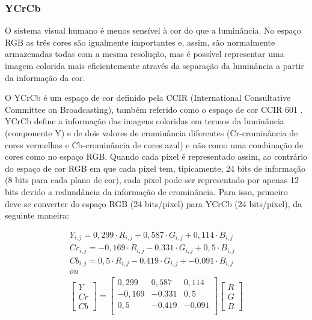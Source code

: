 \subsubsection{YCrCb}
O sistema visual humano é menos sensível à cor do que a luminância. No espaço RGB as três cores são igualmente importantes e, assim, são normalmente armazenadas todas com a mesma resolução, mas é possível representar uma imagem colorida mais eficientemente através da separação da luminância a partir da informação da cor. \cite{richardson2011h}

O YCrCb é um espaço de cor definido pela CCIR (International Consultative Committee on Broadcasting), também referido como o espaço de cor CCIR 601 \cite{acharya2002integrated}. YCrCb define a informação  das imagens coloridas  em termos da luminância (componente Y) e de dois valores de crominância diferentes (Cr-crominância de cores vermelhas e Cb-crominância de cores azul) e não como uma combinação de cores como no espaço RGB. Quando cada pixel é representado assim, ao contrário do espaço de cor RGB em que cada pixel tem, tipicamente, 24 bits de informação (8 bits para cada plano de cor), cada pixel pode ser representado por apenas 12 bits devido a redundância da informação de crominância. Para isso, primeiro deve-se converter do espaço RGB (24 bits/pixel) para YCrCb (24 bits/pixel), da seguinte maneira:
\begin{center}
	\begin{equation}
	\begin{split}
	Y_{i,j} = 0,299\cdot R_{i,j} + 0,587\cdot G_{i,j} + 0,114\cdot B_{i,j}\\
	Cr_{i,j} = -0,169\cdot R_{i,j} -0.331\cdot G_{i,j} + 0,5\cdot B_{i,j}\\
	Cb_{i,j} = 0,5\cdot R_{i,j} -0.419\cdot G_{i,j} + -0.091\cdot B_{i,j}\\
	ou \\
	\begin{bmatrix}		
	Y\\ Cr \\ Cb
	\end{bmatrix}
	 = 
	\begin{bmatrix}
  		0,299 & 0,587 &  0,114 \\
  		-0,169 &-0.331 & 0,5 \\
  		0,5  & -0.419  & -0.091\\
	\end{bmatrix}
	\begin{bmatrix}
	R\\ G \\ B
	\end{bmatrix}
	\label{rgb2yuv} 
	\end{split}
	\end{equation}

\end{center}

